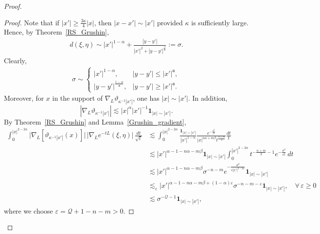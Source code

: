 \documentclass[12pt]{amsart}
\begin{document}
\begin{proof}
\begin{proof}
Note that if $|x'|\ge \frac{3\kappa}{4} |x|$, then $|x-x'|\sim |x'|$ provided $\kappa$ is sufficiently large. Hence, by Theorem~\ref{RS_Grushin},
\begin{align*}
    d(\xi,\eta) \sim |x'|^{1-\alpha} + \frac{|y-y'|}{|x'|^\beta + |y-y'|^{\frac{\beta}{\mathfrak a}}} := \sigma.
\end{align*}
Clearly,
\begin{align}\label{eq_delta}
    \sigma \sim \begin{cases}
        |x'|^{1-\alpha}, & |y-y'|\le |x'|^{\mathfrak a},\\[4pt]
        |y-y'|^{\frac{1-\alpha}{\mathfrak a}}, & |y-y'|\ge |x'|^{\mathfrak a}.
    \end{cases}
\end{align}
Moreover, for $x$ in the support of $\nabla_L \vartheta_{\kappa^{-1} |x'|}$, one has $|x|\sim |x'|$. In addition,
\begin{equation*}
    |\nabla_L \vartheta_{\kappa^{-1} |x'|}|\lesssim |x|^\alpha |x'|^{-1} \mathbf{1}_{|x|\sim |x'|}.
\end{equation*}
By Theorem~\ref{RS_Grushin} and Lemma~\ref{Grushin_gradient},
\begin{align*}
    \int_0^{|x|^{2-2\alpha}} \bigl|\nabla_L [\vartheta_{\kappa^{-1} |x'|}(x)]\bigr| \, \bigl|\nabla_L e^{-tL}(\xi,\eta)\bigr| \, \frac{dt}{\sqrt{t}}
    &\lesssim \int_0^{|x|^{2-2\alpha}} \frac{\mathbf{1}_{|x|\sim |x'|}}{|x'|^{1-\alpha}} \frac{e^{-\frac{\sigma^2}{c t}}}{|x|^{n\alpha+m\beta}t^{\frac{n+m}{2}}} \frac{dt}{t}\\
    &\lesssim |x'|^{\alpha-1-n\alpha-m\beta} \mathbf{1}_{|x|\sim |x'|} \int_0^{|x'|^{2-2\alpha}} t^{-\frac{n+m}{2}-1} e^{-\frac{\sigma^2}{c t}} \, dt\\
    &\lesssim |x'|^{\alpha-1-n\alpha-m\beta} \sigma^{-n-m} e^{-\frac{\sigma^2}{c|x'|^{2-2\alpha}}} \mathbf{1}_{|x|\sim |x'|}\\
    &\lesssim_\varepsilon |x'|^{\alpha-1-n\alpha -m\beta+(1-\alpha)\varepsilon} \sigma^{-n-m-\varepsilon} \mathbf{1}_{|x|\sim |x'|},\quad \forall\, \varepsilon \ge 0\\
    &\lesssim \sigma^{-\mathcal{Q}-1} \mathbf{1}_{|x|\sim|x'|},
\end{align*}
where we choose $\varepsilon = \mathcal{Q}+1-n-m>0$.


\end{proof}
\end{proof}
\end{document}
